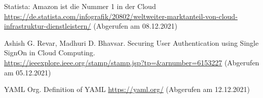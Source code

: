 \begin{thebibliography}{HR08}
  Statista: Amazon ist die Nummer 1 in der Cloud \\
 \url{https://de.statista.com/infografik/20802/weltweiter-marktanteil-von-cloud-infrastruktur-dienstleistern/}
 (Abgerufen am 08.12.2021) 

Ashish G. Revar, Madhuri D. Bhavsar. Securing User Authentication using Single SignOn in Cloud Computing.\\
 \url{https://ieeexplore.ieee.org/stamp/stamp.jsp?tp=&arnumber=6153227}
 (Abgerufen am 05.12.2021) 

YAML Org. Definition of YAML \url{https://yaml.org/}
 (Abgerufen am 12.12.2021)
\end{thebibliography}


